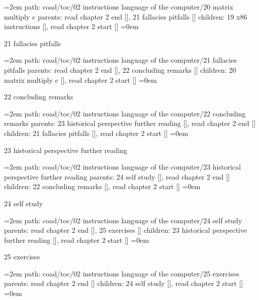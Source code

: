 \leftskip=2em
path: coad/toc/02 instructions language of the computer/20 matrix multiply c
\smallskip
parents:  read chapter 2 end [], 21 fallacies pitfalls []
\smallskip
children: 19 x86 instructions [], read chapter 2 start []
\smallskip
\leftskip=0em
\par\endgroup
\bigskip
{}
21 fallacies pitfalls
\smallskip
\par\begingroup
\leftskip=2em
path: coad/toc/02 instructions language of the computer/21 fallacies pitfalls
\smallskip
parents:  read chapter 2 end [], 22 concluding remarks []
\smallskip
children: 20 matrix multiply c [], read chapter 2 start []
\smallskip
\leftskip=0em
\par\endgroup
\bigskip
{}
22 concluding remarks
\smallskip
\par\begingroup
\leftskip=2em
path: coad/toc/02 instructions language of the computer/22 concluding remarks
\smallskip
parents:  23 historical perspective further reading [], read chapter 2 end []
\smallskip
children: 21 fallacies pitfalls [], read chapter 2 start []
\smallskip
\leftskip=0em
\par\endgroup
\bigskip
{}
23 historical perspective further reading
\smallskip
\par\begingroup
\leftskip=2em
path: coad/toc/02 instructions language of the computer/23 historical perspective further reading
\smallskip
parents:  24 self study [], read chapter 2 end []
\smallskip
children: 22 concluding remarks [], read chapter 2 start []
\smallskip
\leftskip=0em
\par\endgroup
\bigskip
{}
24 self study
\smallskip
\par\begingroup
\leftskip=2em
path: coad/toc/02 instructions language of the computer/24 self study
\smallskip
parents:  read chapter 2 end [], 25 exercises []
\smallskip
children: 23 historical perspective further reading [], read chapter 2 start []
\smallskip
\leftskip=0em
\par\endgroup
\bigskip
{}
25 exercises
\smallskip
\par\begingroup
\leftskip=2em
path: coad/toc/02 instructions language of the computer/25 exercises
\smallskip
parents:  read chapter 2 end []
\smallskip
children: 24 self study [], read chapter 2 start []
\smallskip
\leftskip=0em
